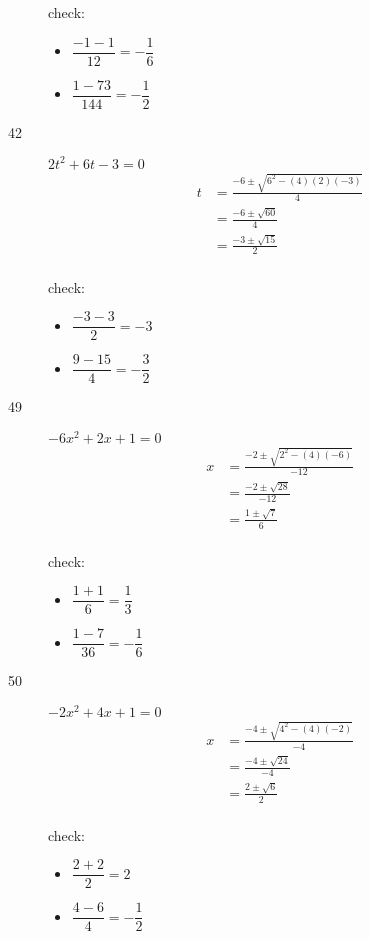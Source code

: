 \documentclass[fleqn,addpoints]{exam}
\begin{document}
\begin{description}
check:
\begin{itemize}
  \item \( \dfrac{-1-1}{12} = - \dfrac{1}{6} \)
  \item \( \dfrac{1-73}{144} = - \dfrac{1}{2} \)
\end{itemize}

\item[42] \( 2t^2 + 6t - 3 = 0 \)
\begin{align*}
  t &= \frac{-6 \pm \sqrt{6^2 - (4)(2)(-3)}}{4} \\
  &= \frac{-6 \pm \sqrt{60}}{4} \\
  &= \frac{-3 \pm \sqrt{15}}{2} \\
\end{align*}

check:
\begin{itemize}
  \item \( \dfrac{-3-3}{2} = -3 \)
  \item \( \dfrac{9-15}{4} = - \dfrac{3}{2} \)
\end{itemize}

\item[49] \( -6x^2 + 2x + 1 = 0 \)
\begin{align*}
  x &= \frac{-2 \pm \sqrt{2^2 - (4)(-6)}}{-12} \\
  &= \frac{-2 \pm \sqrt{28}}{-12} \\
  &= \frac{1 \pm \sqrt{7}}{6} \\
\end{align*}

check:
\begin{itemize}
  \item \( \dfrac{1+1}{6} = \dfrac{1}{3} \)
  \item \( \dfrac{1-7}{36} = - \dfrac{1}{6} \)
\end{itemize}

\item[50] \( -2x^2 + 4x + 1 = 0 \)
\begin{align*}
  x &= \frac{-4 \pm \sqrt{4^2 - (4)(-2)}}{-4} \\
  &= \frac{-4 \pm \sqrt{24}}{-4} \\
  &= \frac{2 \pm \sqrt{6}}{2} \\
\end{align*}

check:
\begin{itemize}
  \item \( \dfrac{2 + 2}{2} = 2 \)
  \item \( \dfrac{4 - 6}{4} = - \dfrac{1}{2} \)
\end{itemize}

\end{description}
\end{document}
